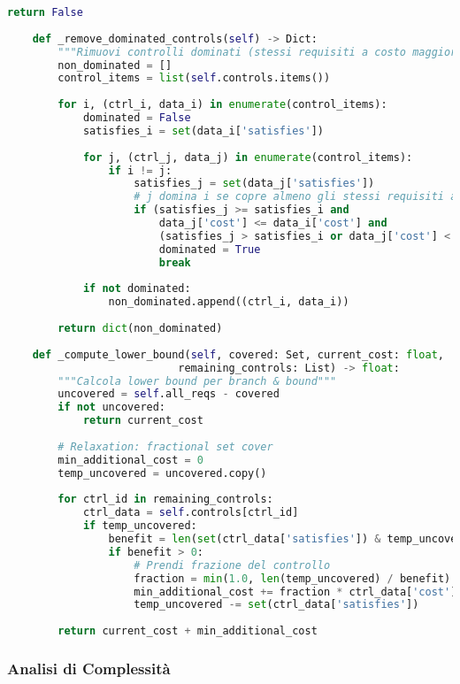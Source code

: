 \begin{lstlisting}[language=Python, caption=Implementazione Weighted Set Cover per Compliance]
        return False
    
    def _remove_dominated_controls(self) -> Dict:
        """Rimuovi controlli dominati (stessi requisiti a costo maggiore)"""
        non_dominated = []
        control_items = list(self.controls.items())
        
        for i, (ctrl_i, data_i) in enumerate(control_items):
            dominated = False
            satisfies_i = set(data_i['satisfies'])
            
            for j, (ctrl_j, data_j) in enumerate(control_items):
                if i != j:
                    satisfies_j = set(data_j['satisfies'])
                    # j domina i se copre almeno gli stessi requisiti a costo minore o uguale
                    if (satisfies_j >= satisfies_i and 
                        data_j['cost'] <= data_i['cost'] and
                        (satisfies_j > satisfies_i or data_j['cost'] < data_i['cost'])):
                        dominated = True
                        break
            
            if not dominated:
                non_dominated.append((ctrl_i, data_i))
        
        return dict(non_dominated)
    
    def _compute_lower_bound(self, covered: Set, current_cost: float, 
                           remaining_controls: List) -> float:
        """Calcola lower bound per branch & bound"""
        uncovered = self.all_reqs - covered
        if not uncovered:
            return current_cost
        
        # Relaxation: fractional set cover
        min_additional_cost = 0
        temp_uncovered = uncovered.copy()
        
        for ctrl_id in remaining_controls:
            ctrl_data = self.controls[ctrl_id]
            if temp_uncovered:
                benefit = len(set(ctrl_data['satisfies']) & temp_uncovered)
                if benefit > 0:
                    # Prendi frazione del controllo
                    fraction = min(1.0, len(temp_uncovered) / benefit)
                    min_additional_cost += fraction * ctrl_data['cost']
                    temp_uncovered -= set(ctrl_data['satisfies'])
        
        return current_cost + min_additional_cost
\end{lstlisting}

\subsubsection{Analisi di Complessità}

